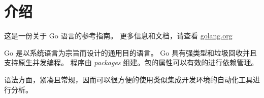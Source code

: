 
\chapter{介绍}
这是一份关于 Go 语言的参考指南。
更多信息和文档，请查看 \href{www.golang.org}{golang.org}

Go 是以系统语言为宗旨而设计的通用目的语言。
Go 具有强类型和垃圾回收并且支持原生并发编程。
程序由 \emph{packages} 组建。包的属性可以有效的进行依赖管理。

语法方面，紧凑且常规，因而可以很方便的使用类似集成开发环境的自动化工具进行分析。